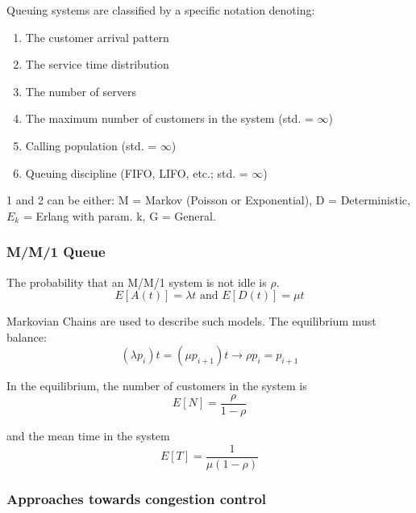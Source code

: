 \documentclass[10pt, a4paper, twocolumn]{scrartcl}
\begin{document}
Queuing systems are classified by a specific notation denoting:
\begin{enumerate}
	\item The customer arrival pattern
	\item The service time distribution
	\item The number of servers
	\item The maximum number of customers in the system (std. = $\infty$)
	\item Calling population (std. = $\infty$)
	\item Queuing discipline (FIFO, LIFO, etc.; std. = $\infty$)
\end{enumerate}

1 and 2 can be either: M = Markov (Poisson or Exponential), D = Deterministic, $E_k$ = Erlang with param. k, G = General.

\subsubsection{M/M/1 Queue}

The probability that an M/M/1 system is not idle is $\rho$.\\

\begin{displaymath}
	E[A(t)] = \lambda t \mbox{ and } E[D(t)] = \mu t
\end{displaymath}

Markovian Chains are used to describe such models. The equilibrium must balance:
\begin{displaymath}
	(\lambda p_i) t = (\mu p_{i+1})t \rightarrow \rho p_i = p_{i+1}
\end{displaymath}

In the equilibrium, the number of customers in the system is
\begin{displaymath}
	E[N] = \frac{\rho}{1-\rho} 
\end{displaymath}

and the mean time in the system
\begin{displaymath}
	E[T] = \frac{1}{\mu(1-\rho)}
\end{displaymath}

\subsubsection{Approaches towards congestion control}
\end{document}
